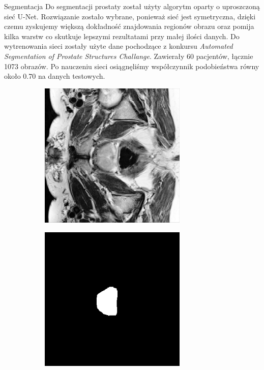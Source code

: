\documentclass[final]{beamer}
\newlength{\onecolwid}
\newlength{\threecolwid}
\begin{document}
\begin{frame}[t]
\begin{columns}[t]
\begin{column}{\threecolwid}
\begin{columns}[t,totalwidth=\threecolwid]
\begin{column}{\onecolwid}
\begin{block}{Segmentacja}
			Do segmentacji prostaty został użyty algorytm oparty o uproszczoną sieć U-Net. Rozwiązanie zostało wybrane, ponieważ sieć jest symetryczna, dzięki czemu zyskujemy większą dokładność znajdowania regionów obrazu oraz pomija kilka warstw co skutkuje lepszymi rezultatami przy małej ilości danych. \newline
			Do wytrenowania sieci zostały użyte dane pochodzące z konkursu \textit{Automated Segmentation of Prostate Structures Challange}. Zawierały 60 pacjentów, łącznie 1073 obrazów. \newline
			Po nauczeniu sieci osiągnęliśmy współczynnik podobieństwa równy około 0.70 na danych testowych.
                \begin{figure}[htb]
                    \centering %
                    \begin{subfigure}{}
                        \includegraphics[width=7cm,angle=270,origin=c]{../segmentation/segmentation_train_1.png}
                        \label{fig:1}
                    \end{subfigure}\hfil %
                    \begin{subfigure}{}
                        \includegraphics[width=7cm,angle=270,origin=c]{../segmentation/segmentaion_mask_1.png}

\end{subfigure}
\end{figure}
\end{block}
\end{column}
\end{columns}
\end{column}
\end{columns}
\end{frame}
\end{document}
